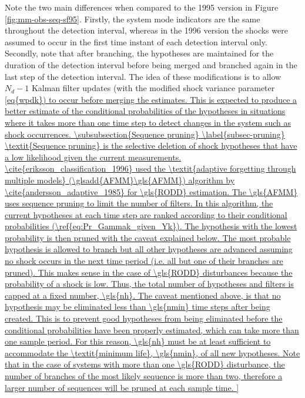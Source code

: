 Note the two main differences when compared to the 1995 version in Figure \ref{fig:mm-obs-seq-sf95}. Firstly, the system mode indicators are the same throughout the detection interval, whereas in the 1996 version the shocks were assumed to occur in the first time instant of each detection interval only. Secondly, note that after branching, the hypotheses are maintained for the duration of the detection interval before being merged and branched again in the last step of the detection interval. The idea of these modifications is to allow $N_d-1$ Kalman filter updates (with the modified shock variance parameter \ref{eq{wpdk}) to occur before merging the estimates. This is expected to produce a better estimate of the conditional probabilities of the hypotheses in situations where it takes more than one time step to detect changes in the system such as shock occurrences.
	
\subsubsection{Sequence pruning} \label{subsec-pruning}

\textit{Sequence pruning} is the selective deletion of shock hypotheses that have a low likelihood given the current measurements. \cite{eriksson_classification_1996} used the \textit{adaptive forgetting through multiple models} (\glsadd{AFMM}\gls{AFMM}) algorithm by \cite{andersson_adaptive_1985} for \gls{RODD} estimation. The \gls{AFMM} uses sequence pruning to limit the number of filters. In this algorithm, the current hypotheses at each time step are ranked according to their conditional probabilities (\ref{eq:Pr_Gammak_given_Yk}). The hypothesis with the lowest probability is then pruned with the caveat explained below. The most probable hypothesis is allowed to branch but all other hypotheses are advanced assuming no shock occurs in the next time period (i.e. all but one of their branches are pruned). This makes sense in the case of \gls{RODD} disturbances because the probability of a shock is low. Thus, the total number of hypotheses and filters is capped at a fixed number, \gls{nh}.

The caveat mentioned above, is that no hypothesis may be eliminated less than \gls{nmin} time steps after being created. This is to prevent good hypotheses from being eliminated before the conditional probabilities have been properly estimated, which can take more than one sample period. For this reason, \gls{nh} must be at least sufficient to accommodate the \textit{minimum life}, \gls{nmin}, of all new hypotheses. Note that in the case of systems with more than one \gls{RODD} disturbance, the number of branches of the most likely sequence is more than two, therefore a larger number of sequences will be pruned at each sample time.

}
